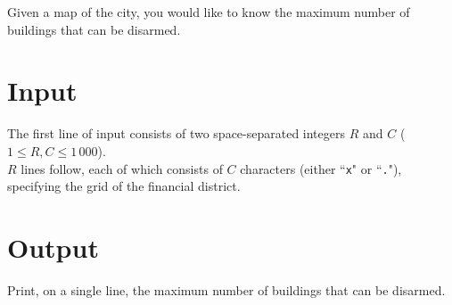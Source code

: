 Given a map of the city, you would like to know the maximum number of buildings that can be disarmed.

\section*{Input}
The first line of input consists of two space-separated integers $R$ and $C$ ($1 \le R, C \le 1\,000$).\\
$R$ lines follow, each of which consists of $C$ characters (either ``\texttt{x}" or ``\texttt{.}"), specifying the grid of the financial district.

\section*{Output}
Print, on a single line, the maximum number of buildings that can be disarmed.\\
